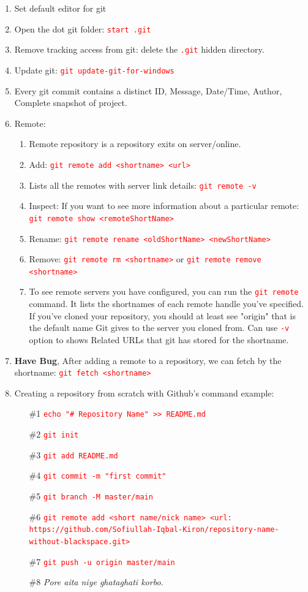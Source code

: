 \documentclass[12 pt, letterpaper]{extarticle}
\newcommand{\R}{\textcolor{red}} %
\newcommand{\T}{\texttt}
\begin{document}
\begin{enumerate}
	\item Set default editor for git
	\item Open the dot git folder: \R{\T{start .git}}
	\item Remove tracking access from git: delete the \R{\T{.git}} hidden directory.
	
	\item Update git: \R{\T{git update-git-for-windows}}
	\item Every git commit contains a distinct ID, Message, Date/Time, Author, Complete snapshot of project.

	\item Remote:
		\begin{enumerate}
			\item Remote repository is a repository exits on server/online.
			\item Add: \R{\T{git remote add <shortname> <url>}}
			\item Lists all the remotes with server link details: \R{\T{git remote -v}}
			\item Inspect: If you want to see more information about a particular remote: \R{\T{git remote show <remoteShortName>}}
			\item Rename: \R{\T{git remote rename <oldShortName> <newShortName>}}
			\item Remove: \R{\T{git remote rm <shortname>}} or \R{\T{git remote remove <shortname>}}
			\item To see remote servers you have configured, you can run the \R{\T{git remote}} command. It lists the shortnames of each remote handle you've specified. If you've cloned your repository, you should at least see "origin" that is the default name Git gives to the server you cloned from. Can use \R{\T{-v}} option to shows Related URLs that git has stored for the shortname.
		\end{enumerate}	
	
	\item \textbf{Have Bug}, After adding a remote to a repository, we can fetch by the shortname: \R{\T{git fetch <shortname>}}
	
	\item Creating a repository from scratch with Github's command example:
		\begin{enumerate}
			\item[\#1] \R{\T{echo "\# Repository Name" >> README.md}}
			\item[\#2] \R{\T{git init}}
			\item[\#3] \R{\T{git add README.md}}
			\item[\#4] \R{\T{git commit -m "first commit"}}
			\item[\#5] \R{\T{git branch -M master/main}}
			\item[\#6] \R{\T{\footnotesize git remote add <short name/nick name> <url:\\https://github.com/Sofiullah-Iqbal-Kiron/repository-name-without-blackspace.git>}}
			\item[\#7] \R{\T{git push -u origin master/main}}
			\item[\#8] \textit{Pore aita niye ghataghati korbo.}
		\end{enumerate}
	

\end{enumerate}
\end{document}
